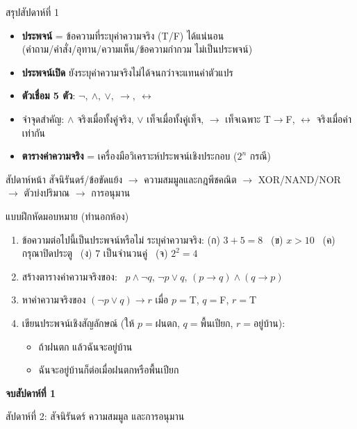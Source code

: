 \begin{frame}{สรุปสัปดาห์ที่ 1}
  \begin{itemize}
    \item \textbf{ประพจน์} = ข้อความที่ระบุค่าความจริง (T/F) ได้แน่นอน \\
          (คำถาม/คำสั่ง/อุทาน/ความเห็น/ข้อความกำกวม ไม่เป็นประพจน์)
    \item \textbf{ประพจน์เปิด} ยังระบุค่าความจริงไม่ได้จนกว่าจะแทนค่าตัวแปร
    \item \textbf{ตัวเชื่อม 5 ตัว}: $\neg,\ \land,\ \lor,\ \rightarrow,\ \leftrightarrow$
    \item จำจุดสำคัญ: $\land$ จริงเมื่อทั้งคู่จริง, $\lor$ เท็จเมื่อทั้งคู่เท็จ,
          $\rightarrow$ เท็จเฉพาะ T$\rightarrow$F, $\leftrightarrow$ จริงเมื่อค่าเท่ากัน
    \item \textbf{ตารางค่าความจริง} = เครื่องมือวิเคราะห์ประพจน์เชิงประกอบ ($2^n$ กรณี)
  \end{itemize}
  \vspace{0.4em}
  \begin{exampleblock}{สัปดาห์หน้า}
    สัจนิรันดร์/ข้อขัดแย้ง $\rightarrow$ ความสมมูลและกฎพีชคณิต $\rightarrow$ XOR/NAND/NOR
    $\rightarrow$ ตัวบ่งปริมาณ $\rightarrow$ การอนุมาน
  \end{exampleblock}
\end{frame}

\begin{frame}{แบบฝึกหัดมอบหมาย (ทำนอกห้อง)}
  \begin{enumerate}\small
    \item ข้อความต่อไปนี้เป็นประพจน์หรือไม่ ระบุค่าความจริง:
          (ก) $3+5=8$ \ (ข) $x>10$ \ (ค) กรุณาปิดประตู \ (ง) $7$ เป็นจำนวนคู่ \ (จ) $2^2=4$
    \item สร้างตารางค่าความจริงของ: \ $p\land\neg q$, \quad $\neg p\lor q$, \quad $(p\rightarrow q)\land(q\rightarrow p)$
    \item หาค่าความจริงของ $(\neg p \lor q)\rightarrow r$ เมื่อ $p=$T, $q=$F, $r=$T
    \item เขียนประพจน์เชิงสัญลักษณ์ (ให้ $p=$ฝนตก, $q=$พื้นเปียก, $r=$อยู่บ้าน):
      \begin{itemize}
        \item ถ้าฝนตก แล้วฉันจะอยู่บ้าน
        \item ฉันจะอยู่บ้านก็ต่อเมื่อฝนตกหรือพื้นเปียก
      \end{itemize}
  \end{enumerate}
\end{frame}

\begin{frame}[plain]
  \vfill
  \centering
  {\Large\color{navy}\textbf{จบสัปดาห์ที่ 1}}\par
  \vspace{0.8em}
  {\color{gray} สัปดาห์ที่ 2: สัจนิรันดร์ ความสมมูล และการอนุมาน}
  \vfill
\end{frame}

